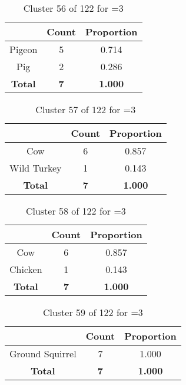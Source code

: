 \begin{table}[ht!]
\centering
\begin{tabular}{|c|c|c|}
\hline
\bf \Spec{} &\bf Count &\bf Proportion\\ \hline \hline
Pigeon & 5 & 0.714\\ \hline
Pig & 2 & 0.286\\ \hline
\hline
\bf Total & \bf 7 & \bf 1.000\\ \hline
\end{tabular}
\label{tab:cluster:56:3}
\caption{Cluster 56 of 122 for \minneigh{}=3}
\end{table}

\begin{table}[ht!]
\centering
\begin{tabular}{|c|c|c|}
\hline
\bf \Spec{} &\bf Count &\bf Proportion\\ \hline \hline
Cow & 6 & 0.857\\ \hline
Wild Turkey & 1 & 0.143\\ \hline
\hline
\bf Total & \bf 7 & \bf 1.000\\ \hline
\end{tabular}
\label{tab:cluster:57:3}
\caption{Cluster 57 of 122 for \minneigh{}=3}
\end{table}

\begin{table}[ht!]
\centering
\begin{tabular}{|c|c|c|}
\hline
\bf \Spec{} &\bf Count &\bf Proportion\\ \hline \hline
Cow & 6 & 0.857\\ \hline
Chicken & 1 & 0.143\\ \hline
\hline
\bf Total & \bf 7 & \bf 1.000\\ \hline
\end{tabular}
\label{tab:cluster:58:3}
\caption{Cluster 58 of 122 for \minneigh{}=3}
\end{table}

\begin{table}[ht!]
\centering
\begin{tabular}{|c|c|c|}
\hline
\bf \Spec{} &\bf Count &\bf Proportion\\ \hline \hline
Ground Squirrel & 7 & 1.000\\ \hline
\hline
\bf Total & \bf 7 & \bf 1.000\\ \hline
\end{tabular}
\label{tab:cluster:59:3}
\caption{Cluster 59 of 122 for \minneigh{}=3}
\end{table}

